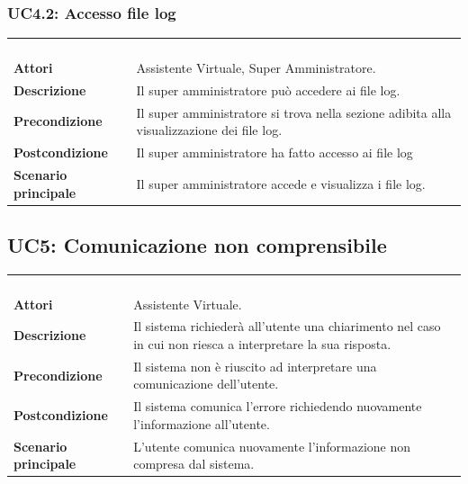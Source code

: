 \subsubsection{UC4.2: Accesso file log}
\label{UC4.2}
\begin{longtable}{l|p{10cm}}
	\rowcolor[gray]{0.8} \multicolumn{2}{c}{} \\
	\rowcolor[gray]{0.8} \multicolumn{2}{c}{\textbf{UC4.2 - Accesso file log}} \\
	\rowcolor[gray]{0.8} \multicolumn{2}{c}{} \\
	\hline
	&\\
	\textbf{Attori} & Assistente Virtuale, Super Amministratore.\\[7pt]
	\textbf{Descrizione} & Il super amministratore può accedere ai file log.\\[7pt]
	\textbf{Precondizione} & Il super amministratore si trova nella sezione adibita alla visualizzazione dei file log.\\[7pt]
	\textbf{Postcondizione} & Il super amministratore ha fatto accesso ai file log\\[7pt]
	\textbf{Scenario principale} &Il super amministratore accede e visualizza i file log.\\[7pt]\hline
\end{longtable}

\subsection{UC5: Comunicazione non comprensibile}
\label{UC5}
\begin{longtable}{l|p{10cm}}
	\rowcolor[gray]{0.8} \multicolumn{2}{c}{} \\
	\rowcolor[gray]{0.8} \multicolumn{2}{c}{\textbf{UC5 - Comunicazione non comprensibile}} \\
	\rowcolor[gray]{0.8} \multicolumn{2}{c}{} \\
	\hline
	&\\
	\textbf{Attori} & Assistente Virtuale.\\[7pt]
	\textbf{Descrizione} & Il sistema richiederà all'utente una chiarimento nel caso in cui non riesca a interpretare la sua risposta.\\[7pt]
	\textbf{Precondizione} & Il sistema non è riuscito ad interpretare una comunicazione dell'utente.\\[7pt]
	\textbf{Postcondizione} & Il sistema comunica l'errore richiedendo nuovamente l'informazione all'utente.\\[7pt]
	\textbf{Scenario principale} &L'utente comunica nuovamente l'informazione non compresa dal sistema.\\[7pt]\hline
\end{longtable}


